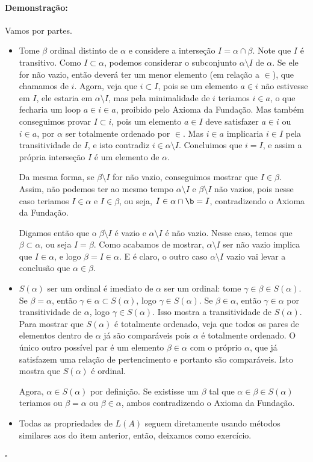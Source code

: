 \documentclass[11pt]{article}
\newcommand{\pulinho}{\vspace{.5cm}}
\theoremstyle{definition}
\theoremstyle{definition}
\theoremstyle{definition}
\theoremstyle{definition}
\theoremstyle{definition}
\theoremstyle{definition}
\theoremstyle{definition}
\theoremstyle{definition}
\theoremstyle{definition}
\theoremstyle{definition}
\theoremstyle{definition}
\theoremstyle{definition}
\newenvironment{prova}{\paragraph{Demonstração:}}{\hfill$\square$ 
\pulinho
}
\theoremstyle{definition}
\begin{document}
\begin{prova}
  Vamos por partes.
  \begin{itemize}[label = ]
    \item  Tome $\beta$ ordinal distinto de $\alpha$ e considere a interseção $I = \alpha \cap \beta$. Note que $I$ é transitivo. Como $I \subset \alpha$, podemos considerar o subconjunto $\alpha \setminus I$ de $\alpha$. Se ele for não vazio, então deverá ter um menor elemento (em relação a $\in$), que chamamos de $i$. Agora, veja que $i \subset I$, pois se um elemento $a \in i$ não estivesse em $I$, ele estaria em $\alpha \setminus I$, mas pela minimalidade de $i$ teriamos $i \in a$, o que fecharia um loop $ a \in i \in a$, proibido pelo Axioma da Fundação. Mas também conseguimos provar $I \subset i$, pois um elemento $a \in I$ deve satisfazer $a \in i$ ou $i \in a$, por $\alpha$ ser totalmente ordenado por $\in$. Mas $i \in a$ implicaria $i \in I$ pela transitividade de $I$, e isto contradiz $i \in \alpha \setminus I$. Concluimos que $i = I$, e assim a própria interseção $I$ é um elemento de $\alpha$.
    
    Da mesma forma, se $\beta \setminus I$ for não vazio, conseguimos mostrar que $I \in \beta$. Assim, não podemos ter ao mesmo tempo $\alpha \setminus I$ e $\beta \setminus I$ não vazios, pois nesse caso teriamos $I \in \alpha$ e $I \in \beta$, ou seja, $I \in \alpha \cap \b = I$, contradizendo o Axioma da Fundação.

    Digamos então que o $\beta \setminus I$ é vazio e $\alpha \setminus I$ é não vazio. Nesse caso, temos que $\beta \subset \alpha$, ou seja $I = \beta$. Como acabamos de mostrar, $\alpha \setminus I$ ser não vazio implica que $I \in \alpha$, e logo $\beta = I \in \alpha$. E é claro, o outro caso $\alpha \setminus I$ vazio vai levar a conclusão que $\alpha \in \beta$.

    \item $S(\alpha)$ ser um ordinal é imediato de $\alpha$ ser um ordinal: tome $\gamma \in \beta \in S(\alpha)$. Se $\beta = \alpha$, então $\gamma \in \alpha \subset S(\alpha)$, logo $\gamma \in S(\alpha)$. Se $\beta \in \alpha$, então $\gamma \in \alpha$ por transitividade de $\alpha$, logo $\gamma \in S(\alpha)$. Isso mostra a transitividade de $S(\alpha)$. Para mostrar que $S(\alpha)$ é totalmente ordenado, veja que todos os pares de elementos dentro de $\alpha$ já são comparáveis pois $\alpha$ é totalmente ordenado. O único outro possível par é um elemento $\beta \in \alpha$ com o próprio $\alpha$, que já satisfazem uma relação de pertencimento e portanto são comparáveis. Isto mostra que $S(\alpha)$ é ordinal.
    
    Agora, $\alpha \in S(\alpha)$ por definição. Se existisse um $\beta$ tal que $\alpha \in \beta \in S(\alpha)$ teriamos ou $\beta = \alpha$ ou $\beta \in \alpha$, ambos contradizendo o Axioma da Fundação.
    
    \item Todas as propriedades de $L(A)$ seguem diretamente usando métodos similares aos do item anterior, então, deixamos como exercício.
  \end{itemize}
\end{prova}
\end{document}
